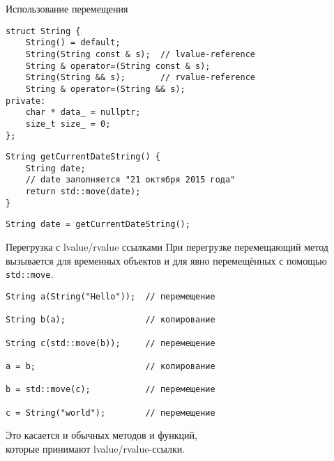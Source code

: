 \documentclass[aspectration=1610,t]{beamer}
\begin{document}
\begin{frame}[fragile]{Использование перемещения}
\begin{lstlisting}
struct String {
    String() = default;
    String(String const & s);  // lvalue-reference
    String & operator=(String const & s);
    String(String && s);       // rvalue-reference
    String & operator=(String && s);
private:
    char * data_ = nullptr;
    size_t size_ = 0;
};
\end{lstlisting}

\begin{lstlisting}
String getCurrentDateString() {
    String date;
    // date заполняется "21 октября 2015 года"
    return std::move(date);
}
\end{lstlisting}

\begin{lstlisting}
String date = getCurrentDateString();
\end{lstlisting}
\end{frame}

\begin{frame}[fragile]{Перегрузка с lvalue/rvalue ссылками}
При перегрузке перемещающий метод вызывается для временных объектов
и для явно перемещённых с помощью \texttt{std::move}.
\begin{lstlisting}
String a(String("Hello"));  // перемещение

String b(a);                // копирование

String c(std::move(b));     // перемещение

a = b;                      // копирование

b = std::move(c);           // перемещение

c = String("world");        // перемещение
\end{lstlisting}

Это касается и обычных методов и функций, \\ которые принимают
lvalue/rvalue-ссылки.  
\end{frame}
\end{document}
